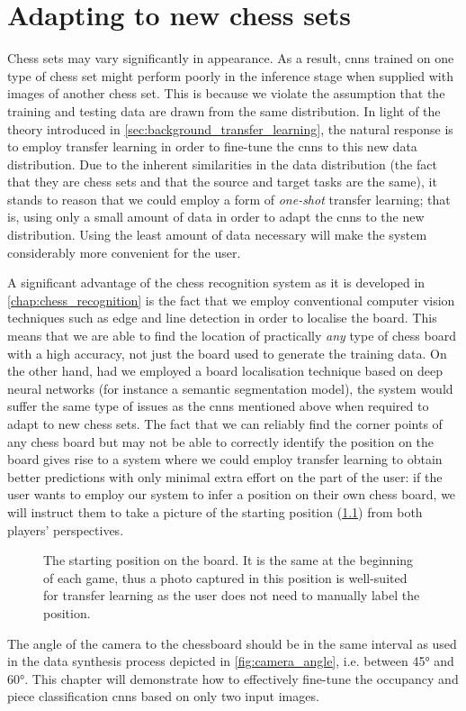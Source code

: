\documentclass[../main.tex]{subfiles}
\begin{document}
\chapter{Adapting to new chess sets}
\label{chap:adapting}

Chess sets may vary significantly in appearance. 
As a result, \glspl{cnn} trained on one type of chess set might perform poorly in the inference stage when supplied with images of another chess set. 
This is because we violate the assumption that the training and testing data are drawn from the same distribution.
In light of the theory introduced in \cref{sec:background_transfer_learning}, the natural response is to employ transfer learning in order to fine-tune the \glspl{cnn} to this new data distribution.
Due to the inherent similarities in the data distribution (the fact that they are chess sets and that the source and target tasks are the same), it stands to reason that we could employ a form of \emph{one-shot} transfer learning; 
that is, using only a small amount of data in order to adapt the \glspl{cnn} to the new distribution.
Using the least amount of data necessary will make the system considerably more convenient for the user.

A significant advantage of the chess recognition system as it is developed in \cref{chap:chess_recognition} is the fact that we employ conventional computer vision techniques such as edge and line detection in order to localise the board.
This means that we are able to find the location of practically \emph{any} type of chess board with a high accuracy, not just the board used to generate the training data.
On the other hand, had we employed a board localisation technique based on deep neural networks (for instance a semantic segmentation model), the system would suffer the same type of issues as the \glspl{cnn} mentioned above when required to adapt to new chess sets.
The fact that we can reliably find the corner points of any chess board but may not be able to correctly identify the position on the board gives rise to a system where we could employ transfer learning to obtain better predictions with only minimal extra effort on the part of the user:
if the user wants to employ our system to infer a position on their own chess board, we will instruct them to take a picture of the starting position (\cref{fig:chess_start_position}) from both players' perspectives.
\begin{figure}[h]
    \centering
    \newgame
    \showboard
    \caption[The starting position on the board.]{The starting position on the board. It is the same at the beginning of each game, thus a photo captured in this position is well-suited for transfer learning as the user does not need to manually label the position.}
    \label{fig:chess_start_position}
\end{figure}
The angle of the camera to the chessboard should be in the same interval as used in the data synthesis process depicted in \cref{fig:camera_angle}, i.e. between 45° and 60°.
This chapter will demonstrate how to effectively fine-tune the occupancy and piece classification \glspl{cnn} based on only two input images.
\end{document}
